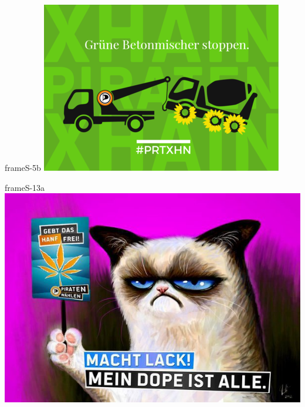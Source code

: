 \documentclass[a4paper,10pt]{article}
\begin{document}
\begin{staticcontents*}{frameS-5b}
\hspace*{-4.5cm}
\vspace*{2cm}
\includegraphics[width=\paperwidth]{images/blog/small/gruenebetonmischer.png}
\vspace*{1cm}
\end{staticcontents*}



\begin{staticcontents*}{frameS-13a}
\includegraphics[viewport = {0cm 0cm 21cm 16cm}, clip]{images/blog/large/machtlack.jpg}
\end{staticcontents*}

\end{document}

